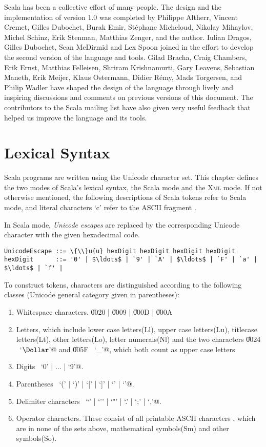 Scala has been a collective effort of many people. The design and the
implementation of version 1.0 was completed by Philippe Altherr,
Vincent Cremet, Gilles Dubochet, Burak Emir, St\'ephane Micheloud,
Nikolay Mihaylov, Michel Schinz, Erik Stenman, Matthias Zenger, and
the author. Iulian Dragos, Gilles Dubochet, Sean McDirmid and Lex
Spoon joined in the effort to develop the second version of the
language and tools.  Gilad Bracha, Craig Chambers, Erik Ernst,
Matthias Felleisen, Shriram Krishnamurti, Gary Leavens, Sebastian
Maneth, Erik Meijer, Klaus Ostermann, Didier R\'emy, Mads Torgersen, and Philip Wadler
have shaped the design of the language through lively and inspiring
discussions and comments on previous versions of this document.  The
contributors to the Scala mailing list have also given very useful
feedback that helped us improve the language and its tools.

\chapter{Lexical Syntax}

Scala programs are written using the Unicode character set.
This chapter defines the two modes of Scala's lexical syntax, the
Scala mode and the \textsc{Xml} mode. If not otherwise mentioned, the following 
descriptions of Scala tokens refer to Scala mode, and literal characters `c' refer 
to the ASCII fragment . 

In Scala mode, \textit{Unicode escapes} are replaced by the corresponding
Unicode character with the given hexadecimal code.
\begin{lstlisting}
UnicodeEscape ::= \{\\}u{u} hexDigit hexDigit hexDigit hexDigit
hexDigit      ::= '0' | $\ldots$ | `9' | `A' | $\ldots$ | `F' | `a' | $\ldots$ | `f' |
\end{lstlisting}
To construct tokens, characters are distinguished according to the following classes 
(Unicode general category given in parentheses):
\begin{enumerate}
\item Whitespace characters. \U{0020} | \U{0009} | \U{000D} | \U{000A}
\item Letters, which include lower case letters(Ll), upper case letters(Lu), titlecase letters(Lt), other letters(Lo), letter numerals(Nl) and the 
two characters \U{0024} ~\lstinline@`$\Dollar$'@ and \U{005F} ~\lstinline@`_'@, which
both count as upper case letters
\item Digits ~\lstinline@`0' | $\ldots$ | `9'@.
\item Parentheses ~\lstinline@`(' | `)' | `[' | `]' | `{' | `}'@.
\item Delimiter characters ~\lstinline@``' | `'' | `"' | `.' | `;' | `,'@.
\item Operator characters. These consist of all printable ASCII characters . 
which are in none of the sets above, mathematical symbols(Sm) and other symbols(So).
\end{enumerate}
\newpage
